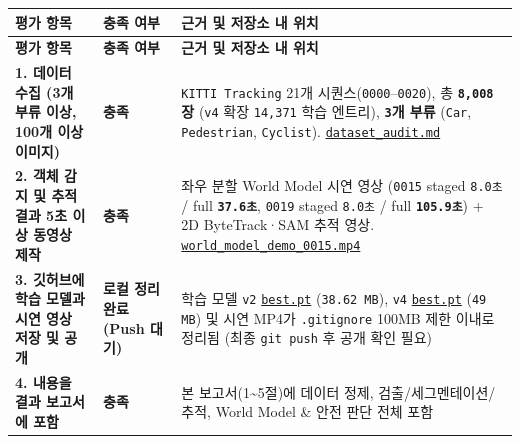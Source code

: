 \documentclass[10.5pt,a4paper]{article}
\begin{document}
\begin{footnotesize}
\setlength{\tabcolsep}{4pt}
\setlength{\LTleft}{0pt}\setlength{\LTright}{0pt}
\begin{longtable}{>{\raggedright\arraybackslash}p{} >{\raggedright\arraybackslash}p{} >{\raggedright\arraybackslash}p{}}
\toprule
\textbf{평가 항목} & \textbf{충족 여부} & \textbf{근거 및 저장소 내 위치} \\
\midrule
\endfirsthead
\toprule
\textbf{평가 항목} & \textbf{충족 여부} & \textbf{근거 및 저장소 내 위치} \\
\midrule
\endhead
\bottomrule
\endfoot
\textbf{1. 데이터 수집 (3개 부류 이상, 100개 이상 이미지)} & \textbf{충족} & \texttt{KITTI Tracking} 21개 시퀀스(\texttt{0000}--\texttt{0020}), 총 \textbf{\texttt{8,\allowbreak{}008}장} (\texttt{v4} 확장 \texttt{14,\allowbreak{}371} 학습 엔트리), \textbf{\texttt{3}개 부류} (\texttt{Car}, \texttt{Pedestrian}, \texttt{Cyclist}). \href{https://github.com/Heisnotanimposter/Totalcare\_autonomous\_driving\_Yolov5/blob/main/dataset\_audit.md}{\texttt{dataset\_\allowbreak{}audit.\allowbreak{}md}} \\
\textbf{2. 객체 감지 및 추적 결과 5초 이상 동영상 제작} & \textbf{충족} & 좌우 분할 World Model 시연 영상 (\texttt{0015} staged \texttt{8.\allowbreak{}0초} / full \textbf{\texttt{37.\allowbreak{}6초}}, \texttt{0019} staged \texttt{8.\allowbreak{}0초} / full \textbf{\texttt{105.\allowbreak{}9초}}) + 2D ByteTrack·SAM 추적 영상. \href{https://github.com/Heisnotanimposter/Totalcare\_autonomous\_driving\_Yolov5/blob/main/results/v4\_road\_lane/world\_outputs/v4\_world\_outputs/world\_model\_0015\_full/world\_model\_demo\_0015.mp4}{\texttt{world\_\allowbreak{}model\_\allowbreak{}demo\_\allowbreak{}0015.\allowbreak{}mp4}} \\
\textbf{3. 깃허브에 학습 모델과 시연 영상 저장 및 공개} & \textbf{로컬 정리 완료 (Push 대기)} & 학습 모델 \texttt{v2} \href{https://github.com/Heisnotanimposter/Totalcare\_autonomous\_driving\_Yolov5/blob/main/results/v2\_improved/outputs/weights/best.pt}{\texttt{best.\allowbreak{}pt}} (\texttt{38.\allowbreak{}62 MB}), \texttt{v4} \href{https://github.com/Heisnotanimposter/Totalcare\_autonomous\_driving\_Yolov5/blob/main/results/v4\_road\_lane/detect\_outputs/outputs/weights/best.pt}{\texttt{best.\allowbreak{}pt}} (\texttt{49 MB}) 및 시연 MP4가 \texttt{.\allowbreak{}gitignore} 100MB 제한 이내로 정리됨 (최종 \texttt{git push} 후 공개 확인 필요) \\
\textbf{4. 내용을 결과 보고서에 포함} & \textbf{충족} & 본 보고서(1\textasciitilde{}5절)에 데이터 정제, 검출/세그멘테이션/추적, World Model \& 안전 판단 전체 포함 \\

\end{longtable}
\end{footnotesize}
\end{document}
